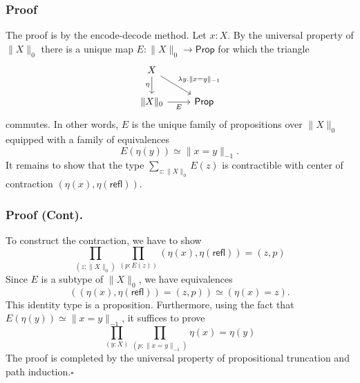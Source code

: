 \documentclass[handout]{beamer}
\newcommand{\trunc}[2]{\|#2\|_{#1}}
\newcommand{\refl}{\mathsf{refl}}
\newcommand{\Prop}{\mathsf{Prop}}
\begin{document}
\begin{frame}
  \frametitle{Proof}
    The proof is by the encode-decode method. Let $x:X$. By the universal property of $\trunc{0}{X}$ there is a unique map $E:\trunc{0}{X}\to\Prop$ for which the triangle
    \begin{equation*}
      \begin{tikzcd}[ampersand replacement=\&]
        X \arrow[d,swap,"\eta"] \arrow[dr,"\lambda y.\trunc{-1}{x=y}"] \\
        \trunc{0}{X} \arrow[r,swap,"E"] \& \Prop
      \end{tikzcd}
    \end{equation*}
    commutes. In other words, $E$ is the unique family of propositions over $\trunc{0}{X}$ equipped with a family of equivalences
    \begin{equation*}
      E(\eta(y))\simeq \trunc{-1}{x=y}.
    \end{equation*}
    It remains to show that the type $\sum_{z:\trunc{0}{X}}E(z)$ is contractible with center of contraction $(\eta(x),\eta(\refl{}))$.
\end{frame}

\begin{frame}
  \frametitle{Proof (Cont).}
  To construct the contraction, we have to show
  \begin{equation*}
    \prod_{(z:\trunc{0}{X})}\prod_{(p:E(z))}(\eta(x),\eta(\refl))=(z,p)
  \end{equation*}
  Since $E$ is a subtype of $\trunc{0}{X}$, we have equivalences
  \begin{equation*}
    ((\eta(x),\eta(\refl))=(z,p))\simeq (\eta(x)=z). 
  \end{equation*}
  This identity type is a proposition. Furthermore, using the fact that $E(\eta(y))\simeq\trunc{-1}{x=y}$, it suffices to prove
  \begin{equation*}
    \prod_{(y:X)}\prod_{(p:\trunc{-1}{x=y})}\eta(x)=\eta(y)
  \end{equation*}
  The proof is completed by the universal property of propositional truncation and path induction.\hfill$\square$ 
\end{frame}
\end{document}
